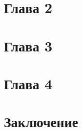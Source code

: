 \documentclass[
        a4paper,
        14pt
]{report}
\begin{document}
\onehalfspacing
\fontsize{14pt}{20}\selectfont  %






\chapter{Глава 2}


\chapter{Глава 3}


\chapter{Глава 4}


\chapter{Заключение}


\tableofcontents
\end{document}
